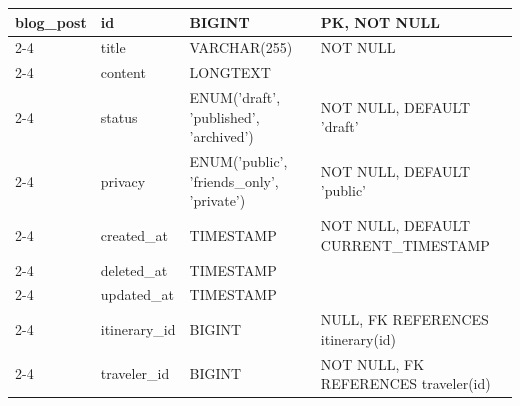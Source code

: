 {\begin{longtable}{|p{2.5cm}|p{3.2cm}|p{4.5cm}|p{4.3cm}|}
\multirow{10}{2.5cm}{\textbf{blog\_post}} 
    & id & BIGINT & PK, NOT NULL \\ \cline{2-4} 
    & title & VARCHAR(255) & NOT NULL \\ \cline{2-4} 
    & content & LONGTEXT & \\ \cline{2-4} 
    & status & ENUM('draft', 'published', 'archived') & NOT NULL, DEFAULT 'draft' \\ \cline{2-4} 
    & privacy & ENUM('public', 'friends\_only', 'private') & NOT NULL, DEFAULT 'public' \\ \cline{2-4} 
    & created\_at & TIMESTAMP & NOT NULL, DEFAULT CURRENT\_TIMESTAMP \\ \cline{2-4} 
    & deleted\_at & TIMESTAMP & \\ \cline{2-4} 
    & updated\_at & TIMESTAMP & \\ \cline{2-4} 
    & itinerary\_id & BIGINT & NULL, FK REFERENCES itinerary(id) \\ \cline{2-4} 
    & traveler\_id & BIGINT & NOT NULL, FK REFERENCES traveler(id) \\ \hline

\end{longtable}
}
